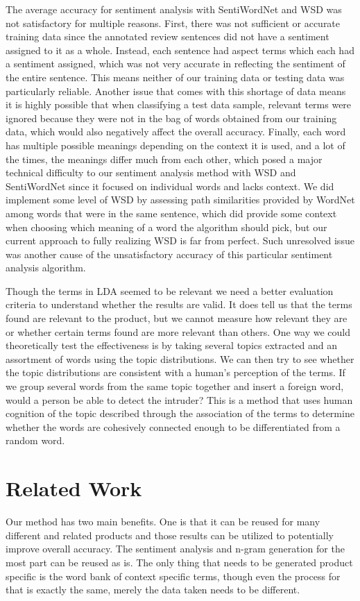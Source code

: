 \documentclass{article}
\begin{document}
The average accuracy for sentiment analysis with SentiWordNet and WSD was not satisfactory for multiple reasons. First, there was not sufficient or accurate training data since the annotated review sentences did not have a sentiment assigned to it as a whole. Instead, each sentence had aspect terms which each had a sentiment assigned, which was not very accurate in reflecting the sentiment of the entire sentence. This means neither of our training data or testing data was particularly reliable. Another issue that comes with this shortage of data means it is highly possible that when classifying a test data sample, relevant terms were ignored because they were not in the bag of words obtained from our training data, which would also negatively affect the overall accuracy. Finally, each word has multiple possible meanings depending on the context it is used, and a lot of the times, the meanings differ much from each other, which posed a major technical difficulty to our sentiment analysis method with WSD and SentiWordNet since it focused on individual words and lacks context. We did implement some level of WSD by assessing path similarities provided by WordNet among words that were in the same sentence, which did provide some context when choosing which meaning of a word the algorithm should pick, but our current approach to fully realizing WSD is far from perfect. Such unresolved issue was another cause of the unsatisfactory accuracy of this particular sentiment analysis algorithm.

Though the terms in LDA seemed to be relevant we need a better evaluation criteria to understand whether the results are valid. It does tell us that the terms found are relevant to the product, but we cannot measure how relevant they are or whether certain terms found are more relevant than others. One way we could theoretically test the effectiveness is by taking several topics extracted and an assortment of words using the topic distributions. We can then try to see whether the topic distributions are consistent with a human's perception of the terms. If we group several words from the same topic together and insert a foreign word, would a person be able to detect the intruder? This is a method that uses human cognition of the topic described through the association of the terms to determine whether the words are cohesively connected enough to be differentiated from a random word.

\section{Related Work}
Our method has two main benefits. One is that it can be reused for many different and related products and those results can be utilized to potentially improve overall accuracy. The sentiment analysis and n-gram generation for the most part can be reused as is. The only thing that needs to be generated product specific is the word bank of context specific terms, though even the process for that is exactly the same, merely the data taken needs to be different.
\end{document}
